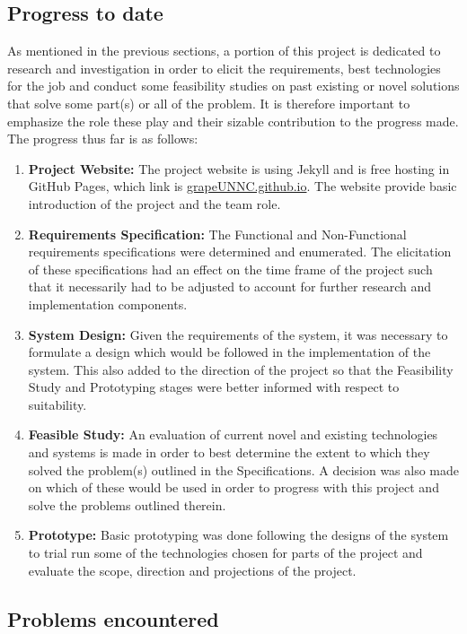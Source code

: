 \documentclass[paper=a4, fontsize=11pt,twoside]{scrartcl}		%
\begin{document}
\subsection{Progress to date}
As mentioned in the previous sections, a portion of this project is dedicated to research and investigation in order to elicit the requirements, best technologies for the job and conduct some feasibility studies on past existing or novel solutions that solve some part(s) or all of the problem. It is therefore important to emphasize the role these play and their sizable contribution to the progress made. The progress thus far is as follows:
\begin{enumerate}
	\item \textbf{Project Website: } The project website is using Jekyll and is free hosting in GitHub Pages, which link is \url{grapeUNNC.github.io}. The website provide basic introduction of the project and the team role.
	\item \textbf{Requirements Specification: }The Functional and Non-Functional requirements specifications were determined and enumerated. The elicitation of these specifications had an effect on the time frame of the project such that it necessarily had to be adjusted to account for further research and implementation components.
	\item \textbf{System Design: }Given the requirements of the system, it was necessary to formulate a design which would be followed in the implementation of the system. This also added to the direction of the project so that the Feasibility Study and Prototyping stages were better informed with respect to suitability.
	\item \textbf{Feasible Study: }An evaluation of current novel and existing technologies and systems is made in order to best determine the extent to which they solved the problem(s) outlined in the Specifications. A decision was also made on which of these would be used in order to progress with this project and solve the problems outlined therein.
	\item \textbf{Prototype: }Basic prototyping was done following the designs of the system to trial run some of the technologies chosen for parts of the project and evaluate the scope, direction and projections of the project.
\end{enumerate}
\subsection{Problems encountered}
\end{document}
